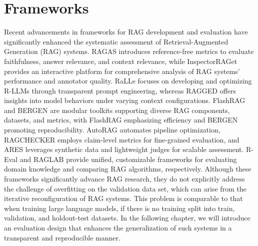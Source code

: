 \section{Frameworks}
Recent advancements in frameworks for RAG development and evaluation have significantly enhanced the systematic assessment of Retrieval-Augmented Generation (RAG) systems. RAGAS \cite{Es.2023} introduces reference-free metrics to evaluate faithfulness, answer relevance, and context relevance, while InspectorRAGet \cite{Fadnis.26.04.2024} provides an interactive platform for comprehensive analysis of RAG systems' performance and annotator quality. RaLLe \cite{Hoshi.8212023b} focuses on developing and optimizing R-LLMs through transparent prompt engineering, whereas RAGGED \cite{JenniferHsia.2024} offers insights into model behaviors under varying context configurations. FlashRAG \cite{Jin.5222024} and BERGEN \cite{Rau.01.07.2024} are modular toolkits supporting diverse RAG components, datasets, and metrics, with FlashRAG emphasizing efficiency and BERGEN promoting reproducibility. AutoRAG \cite{Kim.10282024} automates pipeline optimization, RAGCHECKER \cite{Ru.15.08.2024} employs claim-level metrics for fine-grained evaluation, and ARES \cite{SaadFalcon.16.11.2023} leverages synthetic data and lightweight judges for scalable assessment. R-Eval \cite{Tu.2024} and RAGLAB \cite{Zhang.8212024} provide unified, customizable frameworks for evaluating domain knowledge and comparing RAG algorithms, respectively. Although these frameworks significantly advance RAG research, they do not explicitly address the challenge of overfitting on the validation data set, which can arise from the iterative reconfiguration of RAG systems. This problem is comparable to that when training large language models, if there is no training split into train, validation, and holdout-test datasets. In the following chapter, we will introduce an evaluation design that enhances the generalization of such systems in a transparent and reproducible manner.
